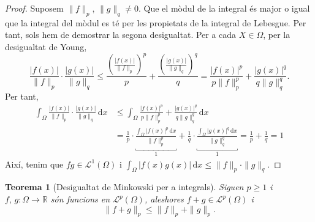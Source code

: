 \documentclass[12pt]{book}
\newtheorem{teorema}{Teorema}[chapter]
\theoremstyle{definition}
\theoremstyle{nota}
\theoremstyle{exemple}
\begin{document}
\begin{proof}
  Suposem $\|f\|_p, \, \|g\|_q \neq 0$. Que el mòdul de la integral és
  major o igual que la integral del mòdul es té per les propietats de
  la integral de Lebesgue. Per tant, sols hem de demostrar la segona
  desigualtat. Per a cada $X \in \Omega$, per la desigualtat de Young,
  \[
    \frac{|f(x)|}{\|f\|_p} \cdot \frac{|g(x)|}{\|g\|_q} \leq
    \frac{\left( \frac{|f(x)|}{\|f\|_p} \right)^p}{p} +
    \frac{\left( \frac{|g(x)|}{\|g\|_q} \right)^q}{q} =
    \frac{|f(x)|^p}{p\|f\|_p^p} + \frac{|g(x)|^q}{q\|g\|_q^q}.
  \]
  Per tant,
  \begin{align*}
    \int_\Omega \frac{|f(x)|}{\|f\|_p} \cdot \frac{|g(x)|}{\|g\|_q}
    \,\mathrm{d}x
    &\leq \int_\Omega \frac{|f(x)|^p}{p\|f\|_p^p} +
      \frac{|g(x)|^q}{q\|g\|_q^q} \,\mathrm{d}x \\
    &=\frac{1}{p} \cdot
      \underbracket{\frac{\int_\Omega|f(x)|^p\,\mathrm{d}x}{\|f\|_p^p}}_1 +
      \frac{1}{q} \cdot
      \underbracket{\frac{\int_\Omega|g(x)|^q\,\mathrm{d}x}{\|g\|_q^q}}_1
      = \frac{1}{p} + \frac{1}{q} = 1
  \end{align*}
  Així, tenim que $fg \in \mathcal{L}^1(\Omega)$ i 
  \(
    \int_\Omega |f(x)g(x)| \, \mathrm{d}x \leq \|f\|_p \cdot \|g\|_q.
  \)
\end{proof}

\begin{teorema}[Desigualtat de Minkowski per a integrals]
  Siguen $p \geq 1$ i $f,\,g : \Omega \to \mathbb{R}$ són funcions en
  $\mathcal{L}^p(\Omega)$, aleshores $f+g \in \mathcal{L}^p(\Omega)$ i
  \[
    \|f + g\|_p \leq \|f\|_p + \|g\|_p.
  \]
\end{teorema}
\end{document}
